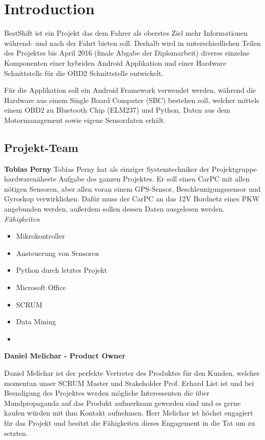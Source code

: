 \chapter{Introduction}
BestShift ist ein Projekt das dem Fahrer als oberstes Ziel mehr Informationen während- und nach der Fahrt bieten soll. Deshalb wird in unterschiedlichen Teilen des Projektes bis April 2016 (finale Abgabe der Diplomarbeit) diverse einzelne Komponenten einer hybriden Android Applikation und einer Hardware Schnittstelle für die OBD2 Schnittstelle entwickelt. 

Für die Applikation soll ein Android Framework verwendet werden, während die Hardware aus einem Single Board Computer (SBC) bestehen soll, welcher mittels einem OBD2 zu Bluetooth Chip (ELM237) und Python, Daten aus dem Motormanagement sowie eigene Sensordaten erhält. 

\section{Projekt-Team}
\textbf{Tobias Perny}
Tobias Perny hat als einziger Systemtechniker der Projektgruppe hardwarenäheste Aufgabe des ganzen Projektes. Er soll einen CarPC mit allen nötigen Sensoren, aber allen voran einem GPS-Sensor, Beschleunigungssensor und Gyroskop verwirklichen. Dafür muss der CarPC an das 12V Bordnetz eines PKW angebunden werden, außerdem sollen dessen Daten ausgelesen werden. 
\textit{Fähigkeiten}
\begin{itemize}
	\item Mikrokontroller
	\item Ansteuerung von Sensoren		
	\item Python durch letztes Projekt
	\item Microsoft Office
	\item SCRUM
	\item Data Mining
	\item {}
\end{itemize}

\textbf{Daniel Melichar - Product Owner}

Daniel Melichar ist der perfekte Vertreter des Produktes für den Kunden, welcher momentan unser SCRUM Master und Stakeholder Prof. Erhard List ist und bei Beendigung des Projektes werden mögliche Interessenten die über Mundpropaganda auf das Produkt aufmerksam geworden sind und es gerne kaufen würden mit ihm Kontakt aufnehmen. Herr Melichar ist höchst engagiert für das Projekt und besitzt die Fähigkeiten dieses Engagement in die Tat um zu setzten.

